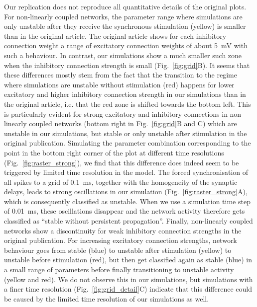 \documentclass[10pt,a4paper,onecolumn]{article}
\begin{document}
Our replication does not reproduce all quantitative details of the original plots. For non-linearly coupled networks, the parameter range where simulations are only unstable after they receive the synchronous stimulation (yellow) is smaller than in the original article. The original article shows for each inhibitory connection weight a range of excitatory connection weights of about \SI{5}{\milli\volt} with such a behaviour. In contrast, our simulations show a much smaller such zone when the inhibitory connection strength is small (Fig.~\ref{fig:grid}B). It seems that these differences mostly stem from the fact that the transition to the regime where simulations are unstable without stimulation (red) happens for lower excitatory and higher inhibitory connection strength in our simulations than in the original article, i.e. that the red zone is shifted towards the bottom left. This is particularly evident for strong excitatory and inhibitory connections in non-linearly coupled networks (bottom right in Fig.~\ref{fig:grid}B and C) which are unstable in our simulations, but stable or only unstable after stimulation in the original publication. Simulating the parameter combination corresponding to the point in the bottom right corner of the plot at different time resolutions (Fig.~\ref{fig:raster_strong}), we find that this difference does indeed seem to be triggered by limited time resolution in the model. The forced synchronisation of all spikes to a grid of \SI{0.1}{\milli\second}, together with the homogeneity of the synaptic delays, leads to strong oscillations in our simulation (Fig.~\ref{fig:raster_strong}A), which is consequently classified as unstable. When we use a simulation time step of \SI{0.01}{\milli\second}, these oscillations disappear and the network activity therefore gets classified as ``stable without persistent propagation''.  Finally, non-linearly coupled networks show a discontinuity for weak inhibitory connection strengths in the original publication. For increasing excitatory connection strengths, network behaviour goes from stable (blue) to unstable after stimulation (yellow) to unstable before stimulation (red), but then get classified again as stable (blue) in a small range of parameters before finally transitioning to unstable activity (yellow and red). We do not observe this in our simulations, but simulations with a finer time resolution (Fig.~\ref{fig:grid_detail}C) indicate that this difference could be caused by the limited time resolution of our simulations as well.
\end{document}
